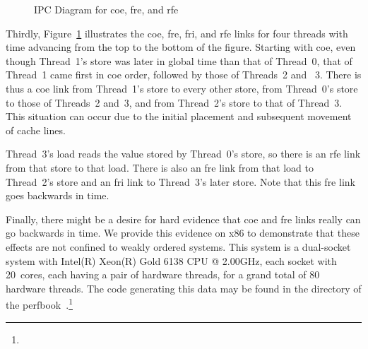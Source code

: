 \documentclass[10]{article}
\begin{document}
\begin{figure}[tb]
\begin{center}
\caption{IPC Diagram for coe, fre, and rfe}
\label{fig:IPC Diagram for coe, fre, and rfe}
\end{center}
\end{figure}

Thirdly, Figure~\ref{fig:IPC Diagram for coe, fre, and rfe} illustrates
the coe, fre, fri, and rfe links for four threads with time advancing
from the top to the bottom of the figure.  Starting with coe, even though
Thread~1's store was later in global time than that of Thread~0, that of
Thread~1 came first in coe order, followed by those of Threads~2 and ~3.
There is thus a coe link from Thread~1's store to every other store,
from Thread~0's store to those of Threads~2 and~3, and from Thread~2's
store to that of Thread~3.
This situation can occur due to the initial placement and subsequent
movement of cache lines.

Thread~3's load reads the value stored by Thread~0's store, so there is
an rfe link from that store to that load.  There is also an fre link from
that load to Thread~2's store and an fri link to Thread~3's later store.
Note that this fre link goes backwards in time.

Finally, there might be a desire for hard evidence that coe and fre
links really can go backwards in time.
We provide this evidence on x86 to demonstrate that these effects
are not confined to weakly ordered systems.
This system is a dual-socket system with
Intel(R) Xeon(R) Gold 6138 CPU @ 2.00GHz,
each socket with 20~cores, each having a pair of hardware
threads, for a grand total of 80 hardware threads.
The code generating this data may be found in the 
directory of the
perfbook~\cite{McKenney2018ParallelProgramming-2018-12-08a}.\footnote{
	}
\end{document}
